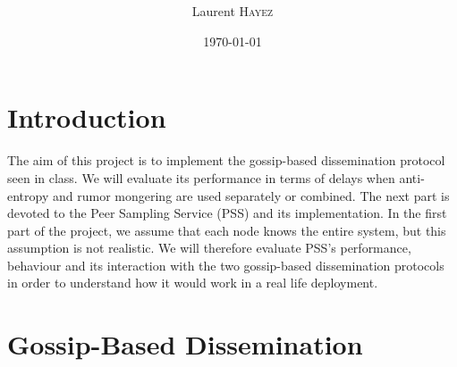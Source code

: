 \documentclass[a4paper, 11pt]{article}
\title{%
  \normalfont{\bfseries{\rule{\linewidth}{2pt} Large-Scale Distributed Systems\\Project 1: Gossip-based dissemination, Peer
    Sampling Service\\ %
    \vspace{-0.4cm}  \rule{\linewidth}{2pt}}}
  }
\author{Laurent \textsc{Hayez}}
\date{\today}
\theoremstyle{plain}
\theoremstyle{definition}
\begin{document}
\renewcommand{\proofname}{{\scshape Proof}}
\renewcommand{\labelitemi}{\textbullet}


\maketitle

\renewcommand{\contentsname}{Table of contents}
\tableofcontents



\section{Introduction}
\label{sec:introduction}

  The aim of this project is to implement the gossip-based dissemination protocol seen in class. We will
  evaluate its performance in terms of delays when anti-entropy and rumor mongering are used separately or
  combined. The next part is devoted to the Peer Sampling Service (PSS) and its implementation. In the first part
  of the project, we assume that each node knows the entire system, but this assumption is not realistic. We will
  therefore evaluate PSS's performance, behaviour and its interaction with the two gossip-based dissemination
  protocols in order to understand how it would work in a real life deployment. 


\section{Gossip-Based Dissemination}
\label{sec:gossip-based-dissemination}
\end{document}

